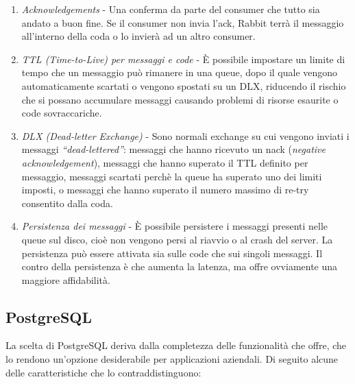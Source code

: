 \begin{itemize}
    \begin{enumerate}
      \item
        \textit{Acknowledgements} -  Una conferma da parte del consumer che tutto sia andato a buon fine.
        Se il consumer non invia l'ack, Rabbit terr\`a il messaggio all'interno della coda o lo invier\`a ad un altro consumer.
      \item \textit{TTL (Time-to-Live) per messaggi e code} - \`E possibile impostare un limite di tempo che un messaggio pu\`o rimanere
        in una queue, dopo il quale vengono automaticamente scartati o vengono spostati su un DLX, riducendo il rischio che si
        possano accumulare messaggi causando problemi di risorse esaurite o code sovraccariche.
      \item \textit{DLX (Dead-letter Exchange)} - Sono normali exchange su cui vengono inviati i messaggi \textit{``dead-lettered''}: messaggi che hanno
        ricevuto un nack (\textit{negative acknowledgement}), messaggi che hanno superato il TTL definito per messaggio, messaggi
        scartati perch\`e la queue ha superato uno dei limiti imposti, o messaggi che hanno superato il numero massimo di re-try consentito dalla coda.
      \item \textit{Persistenza dei messaggi} -  \`E possibile persistere i messaggi presenti nelle queue sul disco,
        cio\`e non vengono persi al riavvio o al crash del server. La persistenza pu\`o essere attivata sia sulle code che sui singoli messaggi.
        Il contro della persistenza \`e che aumenta la latenza, ma offre ovviamente una maggiore affidabilit\`a.
    \end{enumerate}
\end{itemize}

\subsection{PostgreSQL}
La scelta di PostgreSQL deriva dalla completezza delle funzionalit\`a che offre, che lo rendono un'opzione desiderabile per applicazioni aziendali.
Di seguito alcune delle caratteristiche che lo contraddistinguono:

